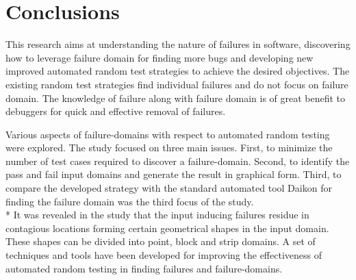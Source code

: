 
\chapter{Conclusions}
\label{chap:conclusions_8}



This research aims at understanding the nature of failures in software, discovering how to leverage failure domain for finding more bugs and developing new improved automated random test strategies to achieve the desired objectives. The existing random test strategies find individual failures and do not focus on failure domain. The knowledge of failure along with failure domain is of great benefit to debuggers for quick and effective removal of failures.

Various aspects of failure-domains with respect to automated random testing were explored. The study focused on three main issues. First, to minimize the number of test cases required to discover a failure-domain. Second, to identify the pass and fail input domains and generate the result in graphical form. Third, to compare the developed strategy with the standard automated tool Daikon for finding the failure domain was the third focus of the study.\\* 
It was revealed in the study that the input inducing failures residue in contagious locations forming certain geometrical shapes in the input domain. These shapes can be divided into point, block and strip domains. A set of techniques and tools have been developed for improving the effectiveness of automated random testing in finding failures and failure-domains. 






